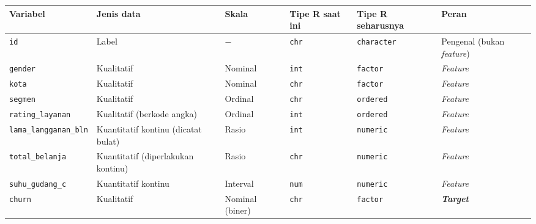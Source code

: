 \documentclass[
  indonesian,
  letterpaper,
]{book}
\newcounter{none} %
\begin{document}
{\def\LTcaptype{none} %
\begin{longtable}[]{@{}
  >{\raggedright\arraybackslash}p{}
  >{\raggedright\arraybackslash}p{}
  >{\raggedright\arraybackslash}p{}
  >{\centering\arraybackslash}p{}
  >{\centering\arraybackslash}p{}
  >{\raggedright\arraybackslash}p{}@{}}
\toprule\noalign{}
\begin{minipage}[b]{\linewidth}\raggedright
Variabel
\end{minipage} & \begin{minipage}[b]{\linewidth}\raggedright
Jenis data
\end{minipage} & \begin{minipage}[b]{\linewidth}\raggedright
Skala
\end{minipage} & \begin{minipage}[b]{\linewidth}\centering
Tipe R saat ini
\end{minipage} & \begin{minipage}[b]{\linewidth}\centering
Tipe R seharusnya
\end{minipage} & \begin{minipage}[b]{\linewidth}\raggedright
Peran
\end{minipage} \\
\midrule\noalign{}
\endhead
\bottomrule\noalign{}
\endlastfoot
\texttt{id} & Label & \(-\) & \texttt{chr} & \texttt{character} &
Pengenal (bukan \emph{feature}) \\
\texttt{gender} & Kualitatif & Nominal & \texttt{int} & \texttt{factor}
& \emph{Feature} \\
\texttt{kota} & Kualitatif & Nominal & \texttt{chr} & \texttt{factor} &
\emph{Feature} \\
\texttt{segmen} & Kualitatif & Ordinal & \texttt{chr} & \texttt{ordered}
& \emph{Feature} \\
\texttt{rating\_layanan} & Kualitatif (berkode angka) & Ordinal &
\texttt{int} & \texttt{ordered} & \emph{Feature} \\
\texttt{lama\_langganan\_bln} & Kuantitatif kontinu (dicatat bulat) &
Rasio & \texttt{int} & \texttt{numeric} & \emph{Feature} \\
\texttt{total\_belanja} & Kuantitatif (diperlakukan kontinu) & Rasio &
\texttt{chr} & \texttt{numeric} & \emph{Feature} \\
\texttt{suhu\_gudang\_c} & Kuantitatif kontinu & Interval & \texttt{num}
& \texttt{numeric} & \emph{Feature} \\
\texttt{churn} & Kualitatif & Nominal (biner) & \texttt{chr} &
\texttt{factor} & \textbf{\emph{Target}} \\
\end{longtable}
}
\end{document}
